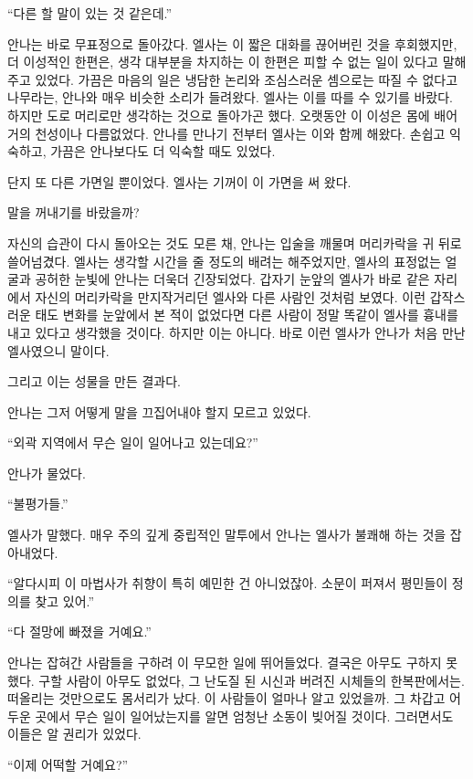 ``다른 할 말이 있는 것 같은데.''

안나는 바로 무표정으로 돌아갔다. 엘사는 이 짧은 대화를 끊어버린 것을 후회했지만, 더 이성적인 한편은, 생각 대부분을 차지하는 이 한편은 피할 수 없는 일이 있다고 말해주고 있었다. 가끔은 마음의 일은 냉담한 논리와 조심스러운 셈으로는 따질 수 없다고 나무라는, 안나와 매우 비슷한 소리가 들려왔다. 엘사는 이를 따를 수 있기를 바랐다. 하지만 도로 머리로만 생각하는 것으로 돌아가곤 했다. 오랫동안 이 이성은 몸에 배어 거의 천성이나 다름없었다. 안나를 만나기 전부터 엘사는 이와 함께 해왔다. 손쉽고 익숙하고, 가끔은 안나보다도 더 익숙할 때도 있었다.

단지 또 다른 가면일 뿐이었다. 엘사는 기꺼이 이 가면을 써 왔다.

\textbreak

말을 꺼내기를 바랐을까?

자신의 습관이 다시 돌아오는 것도 모른 채, 안나는 입술을 깨물며 머리카락을 귀 뒤로 쓸어넘겼다. 엘사는 생각할 시간을 줄 정도의 배려는 해주었지만, 엘사의 표정없는 얼굴과 공허한 눈빛에 안나는 더욱더 긴장되었다. 갑자기 눈앞의 엘사가 바로 같은 자리에서 자신의 머리카락을 만지작거리던 엘사와 다른 사람인 것처럼 보였다. 이런 갑작스러운 태도 변화를 눈앞에서 본 적이 없었다면 다른 사람이 정말 똑같이 엘사를 흉내를 내고 있다고 생각했을 것이다. 하지만 이는 아니다. 바로 이런 엘사가 안나가 처음 만난 엘사였으니 말이다.

그리고 이는 성물을 만든 결과다.

안나는 그저 어떻게 말을 끄집어내야 할지 모르고 있었다.

``외곽 지역에서 무슨 일이 일어나고 있는데요?''

안나가 물었다.

``불평가들.''

엘사가 말했다. 매우 주의 깊게 중립적인 말투에서 안나는 엘사가 불쾌해 하는 것을 잡아내었다.

``알다시피 이 마법사가 취향이 특히 예민한 건 아니었잖아. 소문이 퍼져서 평민들이 정의를 찾고 있어.''

`` 다 절망에 빠졌을 거예요.''

안나는 잡혀간 사람들을 구하려 이 무모한 일에 뛰어들었다. 결국은 아무도 구하지 못했다. 구할 사람이 아무도 없었다, 그 난도질 된 시신과 버려진 시체들의 한복판에서는. 떠올리는 것만으로도 몸서리가 났다. 이 사람들이 얼마나 알고 있었을까. 그 차갑고 어두운 곳에서 무슨 일이 일어났는지를 알면 엄청난 소동이 빚어질 것이다. 그러면서도 이들은 알 권리가 있었다.

``이제 어떡할 거예요?''

